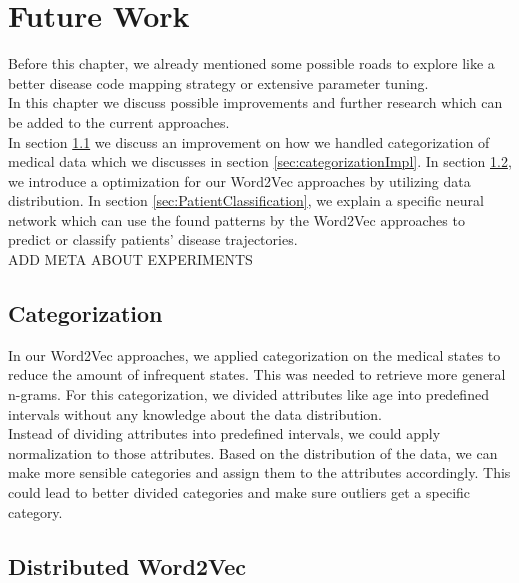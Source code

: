 \graphicspath{ {FutureWork/Images/} }


\chapter{Future Work}
\label{cha:futureWork}

Before this chapter, we already mentioned some possible roads to explore like a better disease code mapping strategy or extensive parameter tuning. \\

In this chapter we discuss possible improvements and further research which can be added to the current approaches. \\
In section \ref{sec:categorization} we discuss an improvement on how we handled categorization of medical data which we discusses in section \ref{sec:categorizationImpl}. In section \ref{sec:distributed}, we introduce a optimization for our Word2Vec approaches by utilizing data distribution. In section \ref{sec:PatientClassification}, we explain a specific neural network which can use the found patterns by the Word2Vec approaches to predict or classify patients' disease trajectories. \\


ADD META ABOUT EXPERIMENTS


\section{Categorization}
\label{sec:categorization}

In our Word2Vec approaches, we applied categorization on the medical states to reduce the amount of infrequent states. This was needed to retrieve more general n-grams. For this categorization, we divided attributes like age into predefined intervals without any knowledge about the data distribution. \\

Instead of dividing attributes into predefined intervals, we could apply normalization to those attributes. Based on the distribution of the data, we can make more sensible categories and assign them to the attributes accordingly. This could lead to better divided categories and make sure outliers get a specific category.


\section{Distributed Word2Vec}
\label{sec:distributed}

